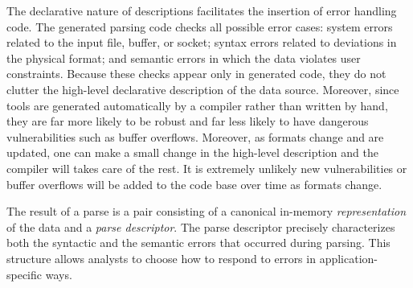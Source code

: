 \documentclass[11pt]{article}
\begin{document}
The declarative nature of \pads{} descriptions facilitates the
insertion of error handling code.  The generated parsing code checks
all possible error cases: system errors related to the input file,
buffer, or socket; syntax errors related to deviations in the physical
format; and semantic errors in which the data violates user
constraints.  Because these checks appear only in generated code, they
do not clutter the high-level declarative description of the data
source.  Moreover, since tools are generated
automatically by a compiler rather than written by hand, 
they are far more likely to be robust
and far less likely to have dangerous vulnerabilities such as
buffer overflows.  Moreover, as formats change and are updated,
one can make a small change in the high-level description
and the compiler will takes care of the rest.  It is extremely unlikely
new vulnerabilities or buffer overflows will be added to the code
base over time as formats change.

The result of a parse is a pair consisting of a canonical
in-memory {\em representation} of the data and a {\em parse descriptor}. 
The parse
descriptor precisely characterizes both the syntactic and the semantic
errors that occurred during parsing.  This structure allows analysts
to choose how to respond to errors in application-specific ways.


\end{document}
